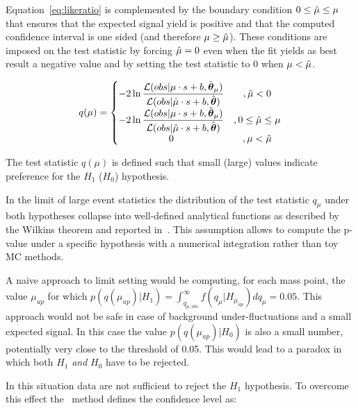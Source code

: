 Equation~\ref{eq:likeratio} is complemented by the boundary condition $0 \leq \hat{\mu} \leq \mu$ that ensures that the expected signal yield is positive and that the computed confidence interval is one sided (and therefore $\mu \geq \hat{\mu}$). These conditions are imposed on the test statistic by forcing $\hat{\mu} = 0$ even when the fit yields as best result a negative value and by setting the test statistic to 0 when $\mu < \hat{\mu}$.

\begin{equation}
q(\mu) = \left\{\begin{matrix}
-2 \operatorname{ln} \dfrac{\mathcal{L}(obs | \mu \cdot s + b, \hat{\boldsymbol\theta}_\mu)}{\mathcal{L}(obs | \hat{\mu} \cdot s + b, \hat{\boldsymbol\theta})} & , \hat{\mu} < 0\\ 
-2 \operatorname{ln} \dfrac{\mathcal{L}(obs | \mu \cdot s + b, \hat{\boldsymbol\theta}_\mu)}{\mathcal{L}(obs | \hat{\mu} \cdot s + b, \hat{\boldsymbol\theta})} & ,0 \leq \hat{\mu} \leq \mu \\ 
0 & , \mu < \hat{\mu}
\end{matrix}\right.
\label{eq:test_stat}
\end{equation}

The test statistic $q(\mu)$ is defined such that small (large) values indicate preference for the $H_1$ ($H_0$) hypothesis.

In the limit of large event statistics the distribution of the test statistic $q_\mu$ under both hypotheses collapse into well-defined analytical functions as described by the Wilkins theorem and reported in~\cite{Cowan:2010js, higgscombo}. This assumption allows to compute the p-value %
under a specific hypothesis with a numerical integration rather than toy MC methods.

A naive approach to limit setting would be computing, for each mass point, the value $\mu_{up}$ for which $p(q(\mu_{up}) | H_1) = \int_{q_{\mu,obs}}^{\infty}f(q_\mu|H_{\mu_{up}})dq_\mu = 0.05$. This approach would not be safe in case of background under-fluctuations and a small expected signal. In this case the value $p(q(\mu_{up}) | H_0)$ is also a small number, potentially very close to the threshold of 0.05. This would lead to a paradox in which both $H_1$ \emph{and} $H_0$ have to be rejected.

In this situation data are not sufficient to reject the $H_1$ hypothesis. To overcome this effect the \CLs\ method defines the confidence level as:

